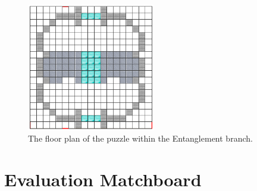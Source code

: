 \documentclass[11pt,twoside]{report} %
\newcommand*\Hidechapter{%
\titleformat{\chapter}[display]
  {}{}{0pt}{\Huge}
}
\begin{document}
\begin{figure}[h!]
\centering
\includegraphics[width=0.5\textwidth]{ent-puzzle}
\caption{The floor plan of the puzzle within the Entanglement branch.}
\label{fig:ent-puzzle}
\end{figure}

{
\Hidechapter
\chapter{Evaluation Matchboard}
\label{app:evamatchboard}
}
\end{document}
